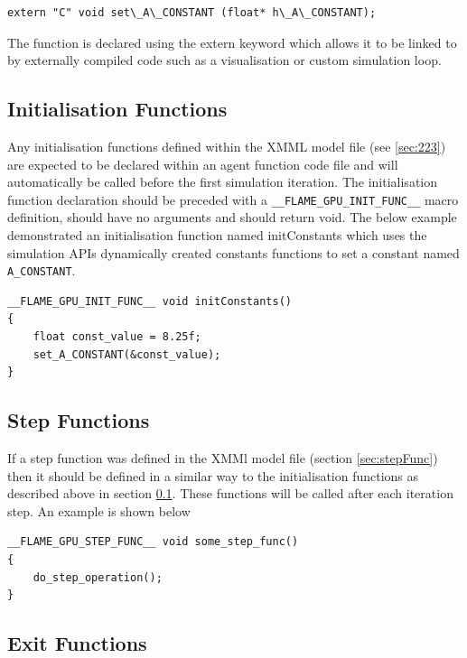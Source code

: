 \documentclass[11pt, a4paper, onecolumn, oneside]{report}
\begin{document}
\begin{verbatim}
extern "C" void set\_A\_CONSTANT (float* h\_A\_CONSTANT);
\end{verbatim}

The function is declared using the extern keyword which allows it to be linked to by externally compiled code such as a visualisation or custom simulation loop.

\subsection{Initialisation Functions}
\label{sec:391}


Any initialisation functions defined within the XMML model file (see \cref{sec:223}) are expected to be declared within an agent function code file and will automatically be called before the first simulation iteration.
The initialisation function declaration should be preceded with a \texttt{__FLAME_GPU_INIT_FUNC__} macro definition, should have no arguments and should return void.
The below example demonstrated an initialisation function named initConstants which uses the simulation APIs dynamically created constants functions to set a constant named \texttt{A_CONSTANT}. 

\begin{verbatim}
__FLAME_GPU_INIT_FUNC__ void initConstants()
{
    float const_value = 8.25f;
    set_A_CONSTANT(&const_value);
}
\end{verbatim}


\subsection{Step Functions}
\label{sec:stepFuncScript}

If a step function was defined in the XMMl model file (section \ref{sec:stepFunc}) then it should be defined in a similar way to the initialisation functions as described above in section \ref{sec:391}. These functions will be called after each iteration step. An example is shown below

\begin{verbatim}
__FLAME_GPU_STEP_FUNC__ void some_step_func()
{
    do_step_operation();
}
\end{verbatim}


\subsection{Exit Functions}
\label{sec:exitFuncScript}
\end{document}
